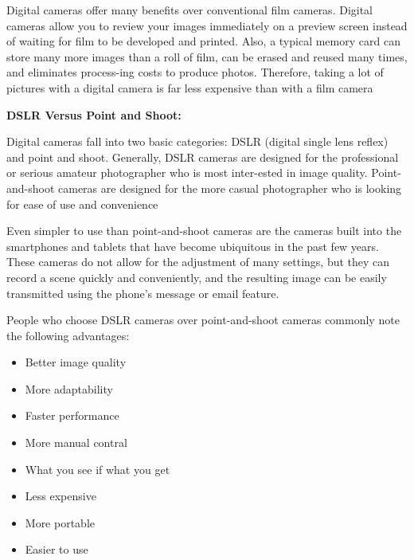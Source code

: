 \documentclass{report}
\begin{document}
    \bigbreak \noindent 
    Digital cameras offer many benefits over conventional film cameras. Digital cameras allow you to review your images immediately on a preview screen instead of waiting for film to be developed and printed. Also, a typical memory card can store many more images than a roll of film, can be erased and reused many times, and eliminates process-ing costs to produce photos. Therefore, taking a lot of pictures with a digital camera is far less expensive than with a film camera

    \bigbreak \noindent 

    \bigbreak \noindent \bigbreak \noindent 
    \begin{Large}
        \textbf{DSLR Versus Point and Shoot:}
    \end{Large}

    \bigbreak \noindent 
    Digital cameras fall into two basic categories: DSLR (digital single lens reflex) and point and shoot. Generally, DSLR cameras are designed for the professional or serious amateur photographer who is most inter-ested in image quality. Point-and-shoot cameras are designed for the more casual photographer who is looking for ease of use and convenience

    \bigbreak \noindent 
    Even simpler to use than point-and-shoot cameras are the cameras built into the smartphones and tablets that have become ubiquitous in the past few years. These cameras do not allow for the adjustment of many settings, but they can record a scene quickly and conveniently, and the resulting image can be easily transmitted using the phone’s message or email feature.

    \bigbreak \noindent 
    People who choose DSLR cameras over point-and-shoot cameras commonly note the following advantages:

    \bigbreak \noindent 
    \begin{itemize}
        \item Better image quality 
        \item More adaptability
        \item Faster performance
        \item More manual contral
        \item What you see if what you get
        \item Less expensive
        \item More portable
        \item Easier to use
    \end{itemize}
\end{document}
